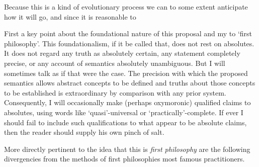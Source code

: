 Because this is a kind of evolutionary process we can to some extent anticipate how it will go, and since it is reasonable to 


First a key point about the foundational nature of this proposal and my  to `first philosophy'.
This foundationalism, if it be called that, does not rest on absolutes.
It does not regard any truth as absolutely certain, any statement completely precise, or any account of semantics absolutely unambiguous.
But I will sometimes talk as if that were the case.
The precision with which the proposed semantics allows abstract concepts to be defined and truths about those concepts to be established is extraordinary by comparison with any prior system.
Consequently, I will occasionally make (perhaps oxymoronic) qualified claims to absolutes, using words like `quasi'-universal or `practically'-complete.
If ever I should fail to include such qualifications to what appear to be absolute claims, then the reader should supply his own pinch of salt.

More directly pertinent to the idea that this is \emph{first philosophy} are the following divergencies from the methods of first philosophies most famous practitioners.

